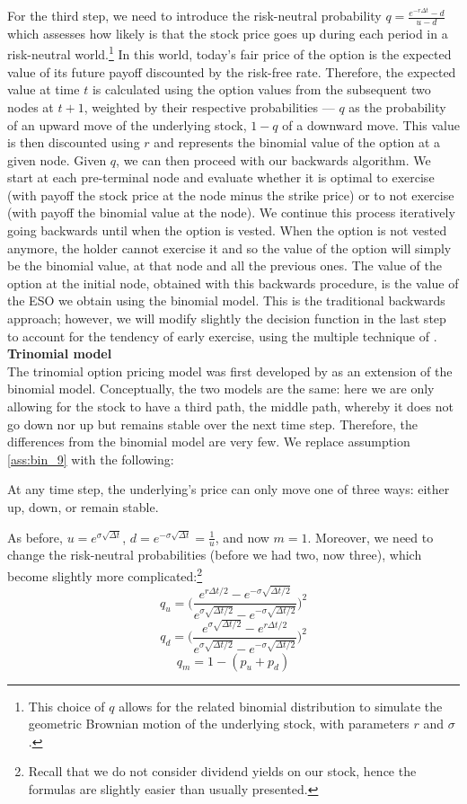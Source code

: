 For the third step, we need to introduce the risk-neutral probability $q = \frac{e^{-r \Delta t} - d}{u-d}$ which assesses how likely is that the stock price goes up during each period in a risk-neutral world.\footnote{This choice of $q$ allows for the related binomial distribution to simulate the geometric Brownian motion of the underlying stock, with parameters $r$ and $\sigma$.} In this world, today's fair price of the option is the expected value of its future payoff discounted by the risk-free rate. Therefore, the expected value at time $t$ is calculated using the option values from the subsequent two nodes at $t+1$, weighted by their respective probabilities --- $q$ as the probability of an upward move of the underlying stock, $1-q$ of a downward move. This value is then discounted using $r$ and represents the binomial value of the option at a given node. 
Given $q$, we can then proceed with our backwards algorithm. We start at each pre-terminal node and evaluate whether it is optimal to exercise (with payoff the stock price at the node minus the strike price) or to not exercise (with payoff the binomial value at the node). We continue this process iteratively going backwards until when the option is vested. When the option is not vested anymore, the holder cannot exercise it and so the value of the option will simply be the binomial value, at that node and all the previous ones.
The value of the option at the initial node, obtained with this backwards procedure, is the value of the ESO we obtain using the binomial model.
This is the traditional backwards approach; however, we will modify slightly the decision function in the last step to account for the tendency of early exercise, using the multiple technique of \citet{cox1979option}. \\


\textbf{Trinomial model}\\
The trinomial option pricing model was  first developed by \citet{boyle1986option} as an extension of the binomial model. Conceptually, the two models are the same: here we are only allowing for the stock to have a third path, the middle path, whereby it does not go down nor up but remains stable over the next time step. Therefore, the differences from the binomial model are very few. We replace assumption \ref*{ass:bin_9} with the following:
\begin{assumption}
    \label{ass:trin_10}
    At any time step, the underlying's price can only move one of three ways: either up, down, or remain stable.
\end{assumption}
As before, $u = e^{\sigma \sqrt{\Delta t}}$, $d = e^{-\sigma \sqrt{\Delta t}}=\frac{1}{u}$, and now $m=1$. Moreover, we need to change the risk-neutral probabilities (before we had two, now three), which become slightly more complicated:\footnote{Recall that we do not consider dividend yields on our stock, hence the formulas are slightly easier than usually presented.}
$$ q_u = \Biggl(\frac{e^{r \Delta t / 2} - e^{-\sigma \sqrt{\Delta t / 2}}}{e^{\sigma \sqrt{\Delta t / 2}} - e^{-\sigma \sqrt{\Delta t / 2}}}\Biggr)^2 $$
$$ q_d = \Biggl(\frac{e^{\sigma \sqrt{\Delta t / 2}} - e^{r \Delta t / 2}}{e^{\sigma \sqrt{\Delta t / 2}} - e^{-\sigma \sqrt{\Delta t / 2}}}\Biggr)^2 $$
$$ q_m = 1 - (p_u + p_d) $$


